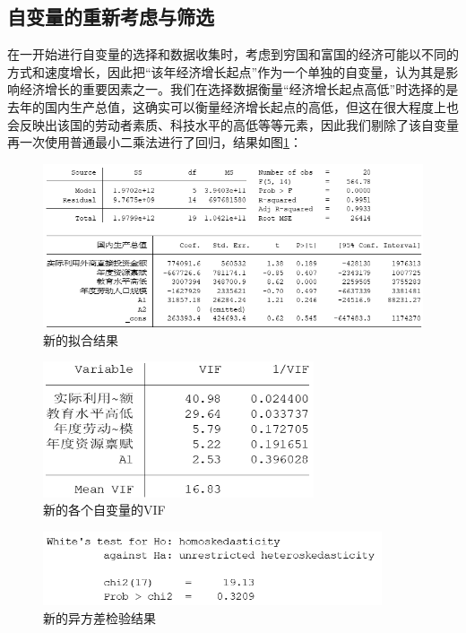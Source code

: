 \documentclass[UTF8]{article}
\begin{document}
	\subsection{自变量的重新考虑与筛选}
	在一开始进行自变量的选择和数据收集时，考虑到穷国和富国的经济可能以不同的方式和速度增长，因此把“该年经济增长起点”作为一个单独的自变量，认为其是影响经济增长的重要因素之一。我们在选择数据衡量“经济增长起点高低”时选择的是去年的国内生产总值，这确实可以衡量经济增长起点的高低，但这在很大程度上也会反映出该国的劳动者素质、科技水平的高低等等元素，因此我们剔除了该自变量再一次使用普通最小二乘法进行了回归，结果如图\ref{nhjg2}：
	\newpage
	\begin{figure}[htb]
		\centering
		\includegraphics[width=12cm]{pictures/nhjg2.png}
		\caption{新的拟合结果}
		\label{nhjg2}
	\end{figure}
	\begin{figure}[htb]
		\centering
		\includegraphics[width=8cm]{pictures/VIF2.png}
		\caption{新的各个自变量的VIF}
		\label{vif2}
	\end{figure}
	\begin{figure}[htb]
		\centering
		\includegraphics[width=10cm]{pictures/yfcjy2.png}
		\caption{新的异方差检验结果}
		\label{yfcjy2}
	\end{figure}
\end{document}
